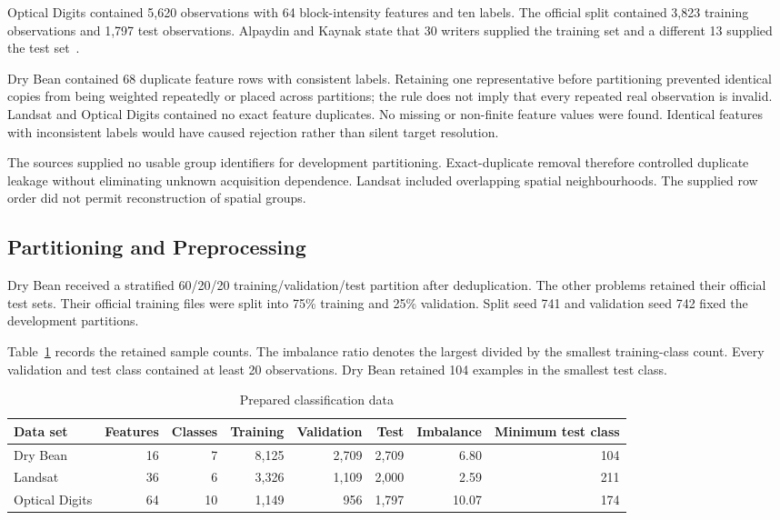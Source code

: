 \documentclass[conference,10pt]{IEEEtran}
\begin{document}
Optical Digits contained 5,620 observations with 64 block-intensity features and ten labels. The official split contained 3,823 training observations and 1,797 test observations. Alpaydin and Kaynak state that 30 writers supplied the training set and a different 13 supplied the test set~\cite{ucioptdigits}.

Dry Bean contained 68 duplicate feature rows with consistent labels. Retaining one representative before partitioning prevented identical copies from being weighted repeatedly or placed across partitions; the rule does not imply that every repeated real observation is invalid. Landsat and Optical Digits contained no exact feature duplicates. No missing or non-finite feature values were found. Identical features with inconsistent labels would have caused rejection rather than silent target resolution.

The sources supplied no usable group identifiers for development partitioning. Exact-duplicate removal therefore controlled duplicate leakage without eliminating unknown acquisition dependence. Landsat included overlapping spatial neighbourhoods. The supplied row order did not permit reconstruction of spatial groups.

\subsection{Partitioning and Preprocessing}

Dry Bean received a stratified 60/20/20 training/validation/test partition after deduplication. The other problems retained their official test sets. Their official training files were split into 75\% training and 25\% validation. Split seed 741 and validation seed 742 fixed the development partitions.

Table~\ref{tab:data} records the retained sample counts. The imbalance ratio denotes the largest divided by the smallest training-class count. Every validation and test class contained at least 20 observations. Dry Bean retained 104 examples in the smallest test class.

\begin{table}[t]
\caption{Prepared classification data}
\label{tab:data}
\centering
\begin{tabular}{@{}lrrrrrrr@{}}
\toprule
Data set & Features & Classes & Training & Validation & Test & Imbalance & Minimum test class \\
\midrule
Dry Bean & 16 & 7 & 8,125 & 2,709 & 2,709 & 6.80 & 104 \\
Landsat & 36 & 6 & 3,326 & 1,109 & 2,000 & 2.59 & 211 \\
Optical Digits & 64 & 10 & 1,149 & 956 & 1,797 & 10.07 & 174 \\
\bottomrule
\end{tabular}
\end{table}
\end{document}
